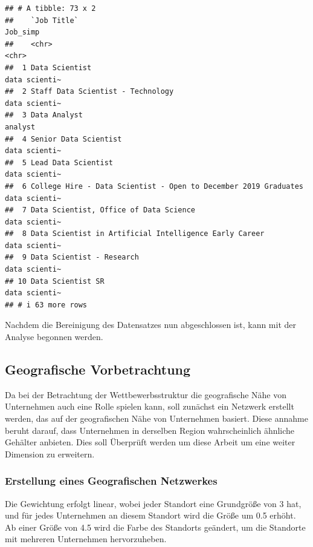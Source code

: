 \documentclass[
]{article}
\begin{document}
\begin{verbatim}
## # A tibble: 73 x 2
##    `Job Title`                                                     Job_simp     
##    <chr>                                                           <chr>        
##  1 Data Scientist                                                  data scienti~
##  2 Staff Data Scientist - Technology                               data scienti~
##  3 Data Analyst                                                    analyst      
##  4 Senior Data Scientist                                           data scienti~
##  5 Lead Data Scientist                                             data scienti~
##  6 College Hire - Data Scientist - Open to December 2019 Graduates data scienti~
##  7 Data Scientist, Office of Data Science                          data scienti~
##  8 Data Scientist in Artificial Intelligence Early Career          data scienti~
##  9 Data Scientist - Research                                       data scienti~
## 10 Data Scientist SR                                               data scienti~
## # i 63 more rows
\end{verbatim}

Nachdem die Bereinigung des Datensatzes nun abgeschlossen ist, kann mit
der Analyse begonnen werden.

\subsection{Geografische
Vorbetrachtung}\label{geografische-vorbetrachtung}

Da bei der Betrachtung der Wettbewerbsstruktur die geografische Nähe von
Unternehmen auch eine Rolle spielen kann, soll zunächst ein Netzwerk
erstellt werden, das auf der geografischen Nähe von Unternehmen basiert.
Diese annahme beruht darauf, dass Unternehmen in derselben Region
wahrscheinlich ähnliche Gehälter anbieten. Dies soll Überprüft werden um
diese Arbeit um eine weiter Dimension zu erweitern.

\subsubsection{Erstellung eines Geografischen
Netzwerkes}\label{erstellung-eines-geografischen-netzwerkes}

Die Gewichtung erfolgt linear, wobei jeder Standort eine Grundgröße von
3 hat, und für jedes Unternehmen an diesem Standort wird die Größe um
0.5 erhöht. Ab einer Größe von 4.5 wird die Farbe des Standorts
geändert, um die Standorte mit mehreren Unternehmen hervorzuheben.
\end{document}
